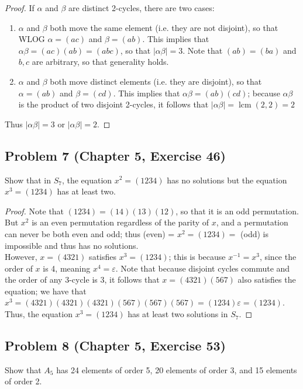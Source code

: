 \documentclass{article}
\DeclareMathOperator{\lcm}{lcm}
\begin{document}
\begin{proof}
If $\alpha$ and $\beta$ are distinct 2-cycles, there are two cases: 
\begin{enumerate}
    \item $\alpha$ and $\beta$ both move the same element (i.e. they are not disjoint), so that WLOG $\alpha = (ac)$ and $\beta = (ab)$. This implies that $\alpha\beta = (ac)(ab) = (abc)$, so that $|\alpha\beta| = 3$. Note that $(ab) = (ba)$ and $b, c$ are arbitrary, so that generality holds.
    \item $\alpha$ and $\beta$ both move distinct elements (i.e. they are disjoint), so that $\alpha = (ab)$ and $\beta = (cd)$. This implies that $\alpha\beta = (ab)(cd)$; because $\alpha\beta$ is the product of two disjoint 2-cycles, it follows that $|\alpha\beta| = \lcm{(2, 2)} = 2$
\end{enumerate}
Thus $|\alpha\beta| = 3$ or $|\alpha\beta| = 2$.

\end{proof}

\subsection*{Problem 7 (Chapter 5, Exercise 46)}

Show that in $S_7$, the equation $x^2 = (1234)$ has no solutions but the equation $x^3 = (1234)$ has at least two.

\begin{proof}

Note that $(1234) = (14)(13)(12)$, so that it is an odd permutation. But $x^2$ is an even permutation regardless of the parity of $x$, and a permutation can never be both even and odd; thus (even) = $x^2 = (1234) = $ (odd) is impossible and thus has no solutions. \\
However, $x = (4321)$ satisfies $x^3 = (1234)$; this is because $x^{-1} = x^3$, since the order of $x$ is 4, meaning $x^4 = \varepsilon$. Note that because disjoint cycles commute and the order of any 3-cycle is 3, it follows that $x = (4321)(567)$ also satisfies the equation; we have that $x^3 = (4321)(4321)(4321)(567)(567)(567) = (1234)\varepsilon = (1234)$. Thus, the equation $x^3 = (1234)$ has at least two solutions in $S_7$. 

\end{proof}

\subsection*{Problem 8 (Chapter 5, Exercise 53)}
Show that $A_5$ has 24 elements of order 5, 20 elements of order 3, and 15 elements of order 2.
\end{document}
